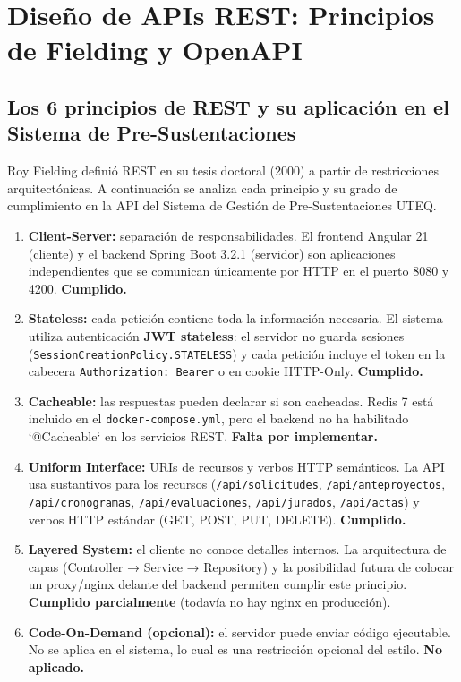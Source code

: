 \section{Diseño de APIs REST: Principios de Fielding y OpenAPI}
\subsection{Los 6 principios de REST y su aplicación en el Sistema de Pre-Sustentaciones}

Roy Fielding definió REST en su tesis doctoral (2000) a partir de restricciones arquitectónicas. A continuación se
analiza cada principio y su grado de cumplimiento en la API del Sistema de Gestión de Pre-Sustentaciones UTEQ.

\begin{enumerate}
    \item \textbf{Client-Server:} separación de responsabilidades. El frontend Angular 21 (cliente) y el backend
    Spring Boot 3.2.1 (servidor) son aplicaciones independientes que se comunican únicamente por HTTP en el puerto
    8080 y 4200. \textbf{Cumplido.}
    \item \textbf{Stateless:} cada petición contiene toda la información necesaria. El sistema utiliza autenticación
    \textbf{JWT stateless}: el servidor no guarda sesiones (\texttt{SessionCreationPolicy.STATELESS}) y cada
    petición incluye el token en la cabecera \texttt{Authorization: Bearer} o en cookie HTTP-Only.
    \textbf{Cumplido.}
    \item \textbf{Cacheable:} las respuestas pueden declarar si son cacheadas. Redis 7 está incluido en el
    \texttt{docker-compose.yml}, pero el backend no ha habilitado `@Cacheable` en los servicios REST.
    \textbf{Falta por implementar.}
    \item \textbf{Uniform Interface:} URIs de recursos y verbos HTTP semánticos. La API usa sustantivos para los
    recursos (\texttt{/api/solicitudes}, \texttt{/api/anteproyectos}, \texttt{/api/cronogramas}, \texttt{/api/evaluaciones},
    \texttt{/api/jurados}, \texttt{/api/actas}) y verbos HTTP estándar (GET, POST, PUT, DELETE).
    \textbf{Cumplido.}
    \item \textbf{Layered System:} el cliente no conoce detalles internos. La arquitectura de capas (Controller →
    Service → Repository) y la posibilidad futura de colocar un proxy/nginx delante del backend permiten cumplir
    este principio. \textbf{Cumplido parcialmente} (todavía no hay nginx en producción).
    \item \textbf{Code-On-Demand (opcional):} el servidor puede enviar código ejecutable. No se aplica en el sistema,
    lo cual es una restricción opcional del estilo. \textbf{No aplicado.}
\end{enumerate}

